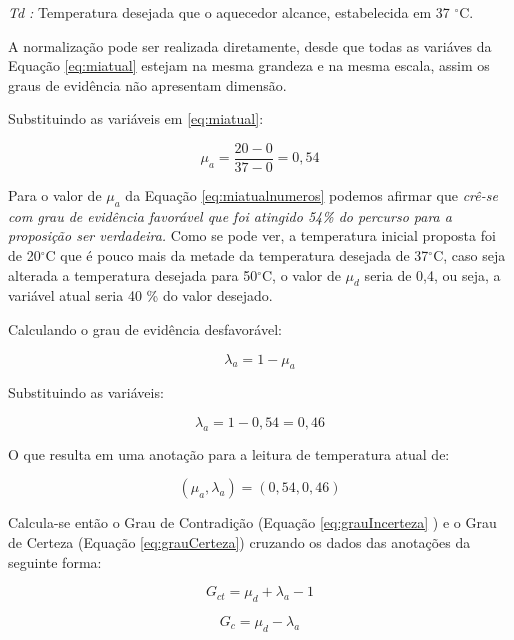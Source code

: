 \emph{Td :} Temperatura desejada que o aquecedor alcance, estabelecida em 37 $^{\circ}$C.

A normalização pode ser realizada diretamente, desde que todas as variáves da Equação \ref{eq:miatual} estejam na mesma grandeza e na mesma escala, assim os graus de evidência não apresentam dimensão.

Substituindo as variáveis em \ref{eq:miatual}:

\begin{equation}
\mu _{a} = 
\frac{20 - 0}{37 - 0} = 0,54
\label{eq:miatualnumeros}
\end{equation}

Para o valor de $\mu _{a}$ da Equação \ref{eq:miatualnumeros} podemos afirmar que \emph{crê-se com grau de evidência favorável que foi atingido 54\% do percurso para a proposição ser verdadeira.} Como se pode ver, a temperatura inicial proposta foi de 20$^{\circ}$C que é pouco mais da metade da temperatura desejada de 37$^{\circ}$C, caso seja alterada a temperatura desejada para 50$^{\circ}$C, o valor de $\mu _{d}$ seria de 0,4, ou seja, a variável atual seria 40 \% do valor desejado. 

Calculando o grau de evidência desfavorável:

\begin{equation}
\lambda _{a}= 1 - \mu _{a}
\label{eq:lambdaatual}
\end{equation}

Substituindo as variáveis:

\begin{equation}
\lambda _{a}= 1 - 0,54 = 0,46
\label{eq:lambdaatualnumeros}
\end{equation}

O que resulta em uma anotação para a leitura de temperatura atual de: 

\begin{equation}
( \mu _{a}, \lambda _{a} ) = (0,54 , 0,46)
\label{eq:valoratual}
\end{equation}

Calcula-se então o Grau de Contradição (Equação \ref{eq:grauIncerteza} ) e o Grau de Certeza (Equação \ref{eq:grauCerteza}) cruzando os dados das anotações da seguinte forma:

\begin{equation}
G _{ct} = \mu _{d} + \lambda _{a} - 1
\label{eq:grauContradicaoCruzado}
\end{equation}

\begin{equation}
G _{c} = \mu _{d} - \lambda _{a}
\label{eq:grauCertezaCruzado}
\end{equation}


